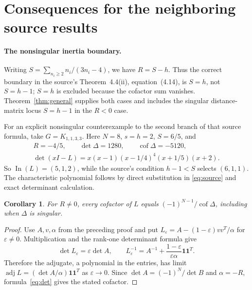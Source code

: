 \documentclass[11pt]{article}
\newtheorem{corollary}[theorem]{Corollary}
\newcommand{\In}{\operatorname{In}}
\newcommand{\cof}{\operatorname{cof}}
\newcommand{\one}{\mathbf{1}}
\begin{document}
\section{Consequences for the neighboring source results}
\paragraph{The nonsingular inertia boundary.}
Writing $S=\sum_{n_i\ge2}n_i/(3n_i-4)$, we have $R=S-h$.
Thus the correct boundary in the source's Theorem~4.4(ii), equation~(4.14),
is $S=h$, not $S=h-1$; $S=h$ is excluded because the cofactor sum vanishes.
Theorem~\ref{thm:general} supplies both cases and includes the singular
distance-matrix locus $S=h-1$ in the $R<0$ case.

For an explicit nonsingular counterexample to the second branch of that
source formula, take $G=K_{1,1,3,3}$. Here $N=8$, $s=h=2$, $S=6/5$, and
\begin{gather*}
 R=-4/5,\qquad \det\Delta=1280,\qquad\cof\Delta=-5120,\\
 \det(xI-L)=x(x-1)(x-1/4)^4(x+1/5)(x+2).
\end{gather*}
So $\In(L)=(5,1,2)$, while the source's condition $h-1<S$
selects $(6,1,1)$. The characteristic polynomial follows by direct substitution
in \eqref{eq:source} and exact determinant calculation.

\begin{corollary}\label{cor:cofactor}
For $R\ne0$, every cofactor of $L$ equals
$(-1)^{N-1}/\cof\Delta$, including when $\Delta$ is singular.
\end{corollary}
\begin{proof}
Use $A,v,\alpha$ from the preceding proof and put
$L_\varepsilon=A-(1-\varepsilon)vv^T/\alpha$ for $\varepsilon\ne0$.
Multiplication and the rank-one determinant formula give
\[
 \det L_\varepsilon=\varepsilon\det A,\qquad
 L_\varepsilon^{-1}=A^{-1}+\frac{1-\varepsilon}{\varepsilon\alpha}\one\one^T.
\]
Therefore the adjugate, a polynomial in the entries, has limit
$\operatorname{adj}L=(\det A/\alpha)\one\one^T$ as $\varepsilon\to0$.
Since $\det A=(-1)^N/\det B$ and $\alpha=-R$, formula~\eqref{eq:det}
gives the stated cofactor.
\end{proof}
\end{document}

